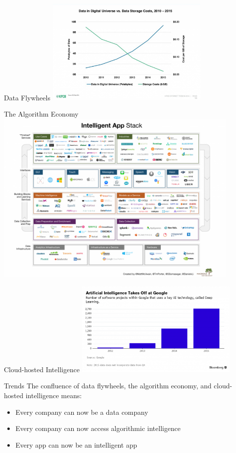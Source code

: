 \documentclass{beamer}
\begin{document}
\begin{frame}{Data Flywheels}
\centering
\includegraphics[width=8cm]{data-vs-cost}
\end{frame}

\begin{frame}{The Algorithm Economy}
\centering
\includegraphics[width=12cm]{figures/intelligent-stack}
\end{frame}

\begin{frame}{Cloud-hosted Intelligence}
\centering
\includegraphics[width=8cm]{figures/cloud-hosted}
\end{frame}

\begin{frame}{Trends}
The confluence of data flywheels, the algorithm economy, and cloud-hosted intelligence means:
\begin{itemize}
\item Every company can now be a data company
\item Every company can now access algorithmic intelligence
\item Every app can now be an intelligent app
\end{itemize}
\end{frame}
\end{document}
